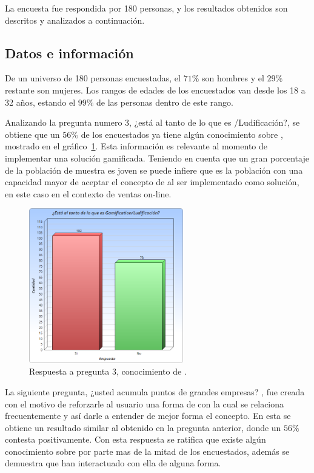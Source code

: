 La encuesta fue respondida por 180 personas, y los resultados obtenidos son descritos y
analizados a continuación.

\subsection{Datos e información}

De un universo de 180 personas encuestadas, el $71\%$ son hombres y el $29\%$ restante son mujeres.
Los rangos de edades de los encuestados van desde los 18 a 32 años, estando el $99\%$ de las personas
dentro de este rango.

Analizando la pregunta numero 3, ¿está al tanto de lo que es {\GAM}/Ludificación?, se obtiene que
 un $56\%$ de los encuestados ya tiene algún conocimiento sobre {\GAM}, mostrado en el gráfico~\ref{fig:chart5.1}.
Esta información es relevante al momento de implementar una solución gamificada.
Teniendo en cuenta que un gran porcentaje de la población de muestra es joven se puede infiere
que es la población con una capacidad mayor de aceptar el concepto de {\GAM} al ser implementado
como solución, en este caso en el contexto de ventas on-line.

\begin{figure}[!htb]
  \centering
  \includegraphics[width=0.6\textwidth]{images/Graficos/graf_5_1.png}
  \caption[chart5.1]{Respuesta a pregunta $3$, conocimiento de {\GAM}.}
  \label{fig:chart5.1}
\end{figure}

La siguiente pregunta, ¿usted acumula puntos de grandes empresas? , fue creada con el motivo de
reforzarle al usuario una forma de {\GAM} con la cual se relaciona frecuentemente y así darle
a entender de mejor forma el concepto. En esta se obtiene un resultado similar al obtenido en
la pregunta anterior, donde un $56\%$ contesta positivamente. Con esta respuesta se ratifica que existe
algún conocimiento sobre {\GAM} por parte mas de la mitad de los encuestados, además se demuestra que
han interactuado con ella de alguna forma.

